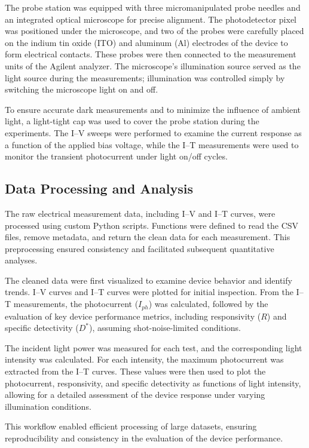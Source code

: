 \documentclass{rapportCS}
\begin{document}
	The probe station was equipped with three micromanipulated probe needles and an integrated optical microscope for precise alignment. The photodetector pixel was positioned under the microscope, and two of the probes were carefully placed on the indium tin oxide (ITO) and aluminum (Al) electrodes of the device to form electrical contacts. These probes were then connected to the measurement units of the Agilent analyzer. The microscope’s illumination source served as the light source during the measurements; illumination was controlled simply by switching the microscope light on and off.
	
	To ensure accurate dark measurements and to minimize the influence of ambient light, a light-tight cap was used to cover the probe station during the experiments. The I–V sweeps were performed to examine the current response as a function of the applied bias voltage, while the I–T measurements were used to monitor the transient photocurrent under light on/off cycles.
	
	\subsection{Data Processing and Analysis}

	The raw electrical measurement data, including I–V and I–T curves, were processed using custom Python scripts. Functions were defined to read the CSV files, remove metadata, and return the clean data for each measurement. This preprocessing ensured consistency and facilitated subsequent quantitative analyses.

	The cleaned data were first visualized to examine device behavior and identify trends. I–V curves and I–T curves were plotted for initial inspection. From the I–T measurements, the photocurrent ($I_{ph}$) was calculated, followed by the evaluation of key device performance metrics, including responsivity ($R$) and specific detectivity ($D^{\ast}$), assuming shot-noise-limited conditions.

	The incident light power was measured for each test, and the corresponding light intensity was calculated. For each intensity, the maximum photocurrent was extracted from the I–T curves. These values were then used to plot the photocurrent, responsivity, and specific detectivity as functions of light intensity, allowing for a detailed assessment of the device response under varying illumination conditions.

	This workflow enabled efficient processing of large datasets, ensuring reproducibility and consistency in the evaluation of the device performance.
	
\end{document}
